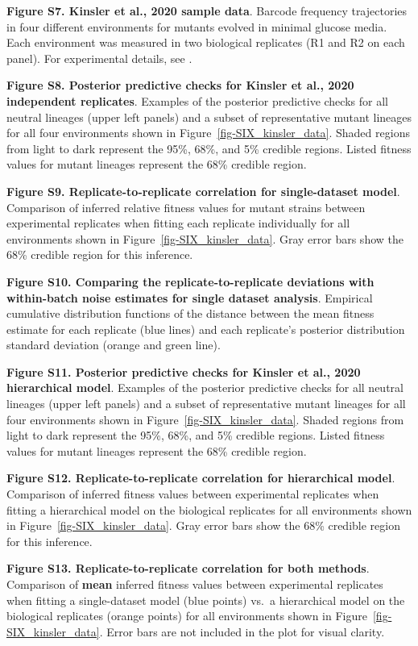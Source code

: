 \documentclass[
]{scrartcl}
\begin{document}
\textbf{Figure S7. Kinsler et al., 2020 sample data}. Barcode frequency
trajectories in four different environments for mutants evolved in minimal
glucose media. Each environment was measured in two biological replicates (R1
and R2 on each panel). For experimental details, see \autocite{kinsler2020}.

\textbf{Figure S8. Posterior predictive checks for Kinsler et al., 2020
independent replicates}. Examples of the posterior predictive checks for all
neutral lineages (upper left panels) and a subset of representative mutant
lineages for all four environments shown in Figure~\ref{fig-SIX_kinsler_data}.
Shaded regions from light to dark represent the 95\%, 68\%, and 5\% credible
regions. Listed fitness values for mutant lineages represent the 68\% credible
region.

\textbf{Figure S9. Replicate-to-replicate correlation for single-dataset model}.
Comparison of inferred relative fitness values for mutant strains between
experimental replicates when fitting each replicate individually for all
environments shown in Figure~\ref{fig-SIX_kinsler_data}. Gray error bars show
the 68\% credible region for this inference.

\textbf{Figure S10. Comparing the replicate-to-replicate deviations with
within-batch noise estimates for single dataset analysis}. Empirical cumulative
distribution functions of the distance between the mean fitness estimate for
each replicate (blue lines) and each replicate's posterior distribution standard
deviation (orange and green line).

\textbf{Figure S11. Posterior predictive checks for Kinsler et al., 2020
hierarchical model}. Examples of the posterior predictive checks for all neutral
lineages (upper left panels) and a subset of representative mutant lineages for
all four environments shown in Figure~\ref{fig-SIX_kinsler_data}. Shaded regions
from light to dark represent the 95\%, 68\%, and 5\% credible regions. Listed
fitness values for mutant lineages represent the 68\% credible region.

\textbf{Figure S12. Replicate-to-replicate correlation for hierarchical model}.
Comparison of inferred fitness values between experimental replicates when
fitting a hierarchical model on the biological replicates for all environments
shown in Figure~\ref{fig-SIX_kinsler_data}. Gray error bars show the 68\%
credible region for this inference.

\textbf{Figure S13. Replicate-to-replicate correlation for both methods}.
Comparison of \textbf{mean} inferred fitness values between experimental
replicates when fitting a single-dataset model (blue points) vs.~a hierarchical
model on the biological replicates (orange points) for all environments shown in
Figure~\ref{fig-SIX_kinsler_data}. Error bars are not included in the plot for
visual clarity.
\end{document}
